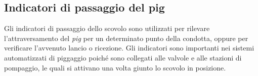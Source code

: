 \subsection{Indicatori di passaggio del pig}
Gli indicatori di passaggio dello scovolo sono utilizzati per rilevare l'attraversamento del \textit{pig} per un determinato punto della condotta, oppure per verificare l'avvenuto lancio o ricezione. Gli indicatori sono importanti nei sistemi automatizzati di piggaggio poiché sono collegati alle valvole e alle stazioni di pompaggio, le quali si attivano una volta giunto lo scovolo in posizione.

\begin{figure}[htbp]
    \centering
    \qquad
    \\

\end{figure}
